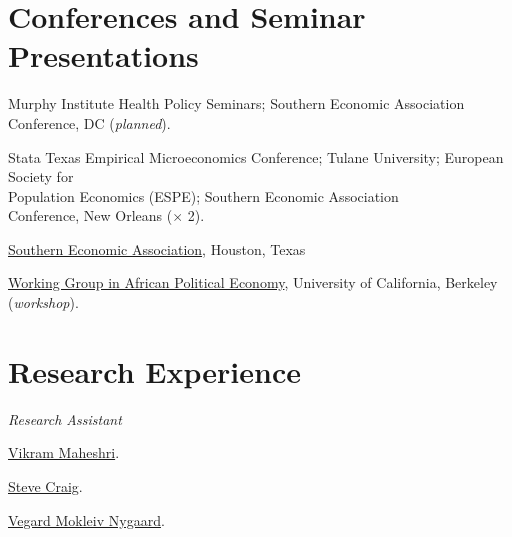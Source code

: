 \documentclass[letterpaper]{article}
\renewenvironment{itemize}{
  \begin{list}{}{
    \setlength{\leftmargin}{1.5em}
  }
}{
  \end{list}
}
\begin{document}
\section*{Conferences and Seminar Presentations}
\vspace{2 mm}
\begin{itemize}
\item {}Murphy Institute Health Policy Seminars; Southern Economic Association \\{\makebox[1.8cm]{\hfill}}Conference, DC (\textit{planned}).
\item {}Stata Texas Empirical Microeconomics Conference; Tulane University; European Society for \\{\makebox[1.8cm]{\hfill}}Population Economics (ESPE); Southern Economic Association \\{\makebox[1.8cm]{\hfill}}Conference, New Orleans ($\times$ 2).
\item {}\href{https://www.southerneconomic.org/session-details/?conferenceId=7&eventId=3353}%
{Southern Economic Association}, Houston, Texas
\item {}\href{https://cega.berkeley.edu/initiative/working-group-in-african-political-economy/}%
{Working Group in African Political Economy}, University of  California, Berkeley (\textit{workshop}).

\end{itemize}

\vspace{2 mm}

\section*{Research Experience}
\vspace{2 mm}
\textit{Research Assistant}
\begin{itemize}
\item {}\href{https://vmaheshri.github.io/}{Vikram Maheshri}.
\item {}\href{https://www.uh.edu/class/economics/people/current-faculty/steve/}{Steve Craig}.
\item {}\href{https://sites.google.com/site/vegardmokleivnygaard/}{Vegard Mokleiv Nygaard}.


\end{itemize}
\end{document}
